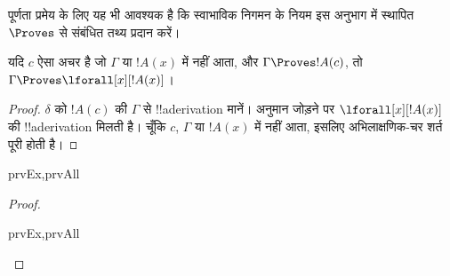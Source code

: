 \documentclass[../../../include/open-logic-section]{subfiles}
\begin{document}


\begin{explain}
  पूर्णता प्रमेय के लिए यह भी आवश्यक है कि स्वाभाविक निगमन के नियम इस अनुभाग
  में स्थापित~$\Proves$ से संबंधित तथ्य प्रदान करें।
\end{explain}

\begin{thm}
 यदि $c$ ऐसा अचर है जो $\Gamma$ या
$!A(x)$ में नहीं आता, और $\Gamma \Proves !A(c)$, तो $\Gamma
\Proves \lforall[x][!A(x)]$।
\end{thm}

\begin{proof}
$\delta$ को $!A(c)$ की $\Gamma$ से !!a{derivation} मानें।
\Intro{\lforall} अनुमान जोड़ने पर $\lforall[x][!A(x)]$ की !!a{derivation}
मिलती है। चूँकि $c$, $\Gamma$ या $!A(x)$ में नहीं आता, इसलिए
अभिलाक्षणिक-चर शर्त पूरी होती है।
\end{proof}

\begin{prop}
\begin{tagenumerate}{prvEx,prvAll}

\end{tagenumerate}
\end{prop}

\begin{proof}
\begin{tagenumerate}{prvEx,prvAll}

\end{tagenumerate}
\end{proof}
\end{document}
